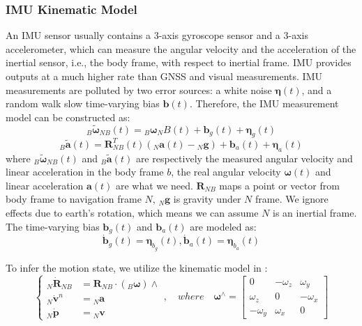 \documentclass[journal,article,submit,moreauthors,pdftex]{Definitions/mdpi}
\begin{document}
\subsubsection{IMU Kinematic Model}
An IMU sensor usually contains a 3-axis gyroscope sensor and a 3-axis accelerometer, which can measure the angular velocity and the acceleration of the inertial sensor, i.e., the body frame, with respect to inertial frame. IMU provides outputs at a much higher rate than GNSS and visual measurements. IMU measurements are polluted by two error sources: a white noise $\boldsymbol{\eta}(t)$, and a random walk slow time-varying bias $\boldsymbol{b}(t)$. Therefore, the IMU measurement model can be constructed as:
\begin{equation}
    {_B}\widetilde{\boldsymbol{\omega}}_{NB}(t) = {_B}\boldsymbol{\omega}{_NB}(t) + \boldsymbol{b}_g(t) + \boldsymbol{\eta}_g(t)
\end{equation}
\begin{equation}
    {_B}\widetilde{\boldsymbol{a}}(t) = \boldsymbol{R}_{NB}^T(t)({_N}\boldsymbol{a}(t)-{_N}\boldsymbol{g}) + \boldsymbol{b}_a(t) + \boldsymbol{\eta}_a(t)
\end{equation}
where ${_B}\widetilde{\boldsymbol{\omega}}_{NB}(t)$ and ${_B}\widetilde{\boldsymbol{a}}(t)$ are respectively the measured angular velocity and linear acceleration in the body frame $b$, the real angular velocity $\boldsymbol{\omega}(t)$ and linear acceleration $\boldsymbol{a}(t)$ are what we need. $\boldsymbol{R}_{NB}$ maps a point or vector from body frame to navigation frame $N$, ${_N}\boldsymbol{g}$ is gravity under $N$ frame. We ignore effects due to earth’s rotation, which means we can assume $N$ is an inertial frame. The time-varying bias $\boldsymbol{b}_g(t)$ and $\boldsymbol{b}_a(t)$ are modeled as:
\begin{equation}
    \boldsymbol{\dot{b}}_g(t) = \boldsymbol{\eta}_{b_g}(t),
    \boldsymbol{\dot{b}}_a(t) = \boldsymbol{\eta}_{b_a}(t)
\end{equation}

To infer the motion state, we utilize the kinematic model in \cite{forsterOnManifoldPreintegrationRealTime2017}:
\begin{equation}
	\left\{
	\begin{aligned}
		{_N}\boldsymbol{\dot{R}}_{NB} & = \boldsymbol{R}_{NB} \cdot (_{B}\boldsymbol{\omega}){\land} \\
		{_N}\boldsymbol{\dot{v}}^n   & = {_N}\boldsymbol{a}                                      \\
		{_N}\boldsymbol{\dot{p}}   & = {_N}\boldsymbol{v}                                        
	\end{aligned}
	\right.,\quad
	where \quad \boldsymbol{\omega}^{\land}=\left[
		\begin{matrix}
			0         & -\omega_z & \omega_y  \\
			\omega_z  & 0         & -\omega_x \\
			-\omega_y & \omega_x  & 0         
		\end{matrix}
    \right]
    \label{IMU-kinematic-model}
\end{equation}
\end{document}
